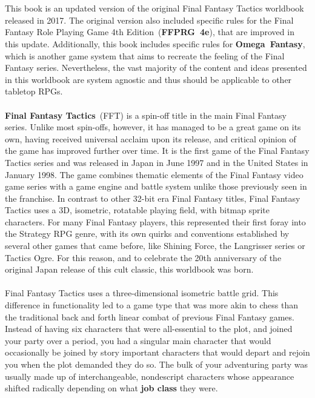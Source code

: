%
\\\\
%
This book is an updated version of the original Final Fantasy Tactics worldbook released in 2017.
The original version also included specific rules for the Final Fantasy Role Playing Game 4th Edition~(\textbf{FFPRG~4e}), that are improved in this update.
Additionally, this book includes specific rules for \textbf{Omega~Fantasy}, which is another game system that aims to recreate the feeling of the Final Fantasy series.
Nevertheless, the vast majority of the content and ideas presented in this worldbook are system agnostic and thus should be applicable to other tabletop RPGs. 
%
\\\\
%
\textbf{Final Fantasy Tactics}~(FFT) is a spin-off title in the main Final Fantasy series. 
Unlike most spin-offs, however, it has managed to be a great game on its own, having received universal acclaim upon its release, and critical opinion of the game has improved further over time. 
It is the first game of the Final Fantasy Tactics series and was released in Japan in June 1997 and in the United States in January 1998. 
The game combines thematic elements of the Final Fantasy video game series with a game engine and battle system unlike those previously seen in the franchise. 
In contrast to other 32-bit era Final Fantasy titles, Final Fantasy Tactics uses a 3D, isometric, rotatable playing field, with bitmap sprite characters.
For many Final Fantasy players, this represented their first foray into the Strategy RPG genre, with its own quirks and conventions established by several other games that came before, like Shining Force, the Langrisser series or Tactics Ogre. 
For this reason, and to celebrate the 20th anniversary of the original Japan release of this cult classic, this worldbook was born.
%
\\\\
%
Final Fantasy Tactics uses a three-dimensional isometric battle grid. 
This difference in functionality led to a game type that was more akin to chess than the traditional back and forth linear combat of previous Final Fantasy games. 
Instead of having six characters that were all-essential to the plot, and joined your party over a period, you had a singular main character that would occasionally be joined by story important characters that would depart and rejoin you when the plot demanded they do so. 
The bulk of your adventuring party was usually made up of interchangeable, nondescript characters whose appearance shifted radically depending on what \textbf{job class} they were.

